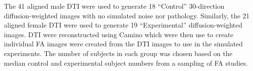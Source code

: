 \documentclass[final,5p,times,twocolumn]{elsarticle}
\newcommand{\lstsetcpp}
{
\lstset{frame = tb,
        framerule = 0.25pt,
        float,
        fontadjust,
        backgroundcolor={\color{listlightgray}},
        basicstyle = {\ttfamily\scriptsize},
        keywordstyle = {\ttfamily\color{listkeyword}\textbf},
        identifierstyle = {\ttfamily},
        commentstyle = {\ttfamily\color{listcomment}\textit},
        stringstyle = {\ttfamily},
        showstringspaces = false,
        showtabs = false,
        numbers = none,
        numbersep = 6pt,
        numberstyle={\ttfamily\color{listnumbers}},
        tabsize = 2,
        language=[ANSI]C++,
        floatplacement=!h,
        caption={\small {\ttfamily CreateDTICohort} which implements the a ground truth DTI simulator \cite{van-hecke2009}.  The short command line menu which is invoked using the  `{\ttfamily {-}h}'  option.  The long command line menu is obtained by typing `{\ttfamily {-}{-}help}'},
        captionpos=b,
        }
}
\begin{document}
The 41 aligned male DTI were used to generate 18 ``Control'' 30-direction
diffusion-weighted images
with no simulated noise nor pathology.  Similarly, the 21 aligned female
DTI were used to generate 19 ``Experimental'' diffusion-weighted images.  
DTI were reconstructed using Camino which were then use to create
individual FA images were
created from the DTI images to use in the simulated experiments.
The number of subjects in each
group was chosen based on the median control and experimental
subject numbers from a sampling of FA studies.  




%
%
\end{document}
